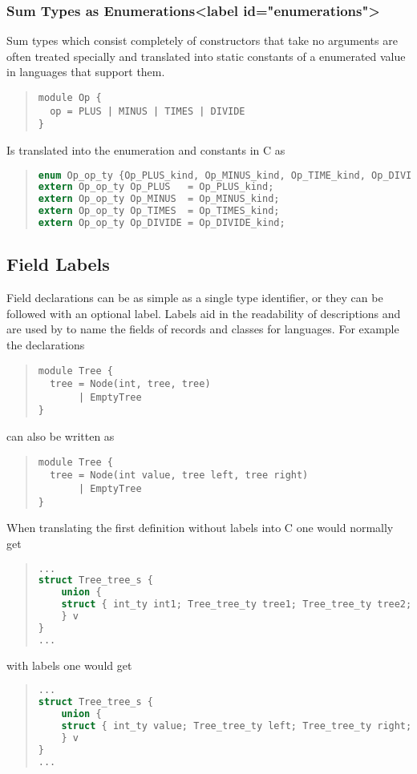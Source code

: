 \subsubsection{Sum Types as Enumerations<label id="enumerations">}
Sum types which consist completely of constructors that take no arguments
are often treated specially and translated into static constants of a
enumerated value in languages that support them.
\begin{quote}\begin{lstlisting}[language=ASDL]
module Op {
  op = PLUS | MINUS | TIMES | DIVIDE 
}
\end{lstlisting}\end{quote}%

Is translated into the enumeration and constants in C as
\begin{quote}\begin{lstlisting}[language=c]
enum Op_op_ty {Op_PLUS_kind, Op_MINUS_kind, Op_TIME_kind, Op_DIVIDE_kind};
extern Op_op_ty Op_PLUS   = Op_PLUS_kind;
extern Op_op_ty Op_MINUS  = Op_MINUS_kind;
extern Op_op_ty Op_TIMES  = Op_TIMES_kind;
extern Op_op_ty Op_DIVIDE = Op_DIVIDE_kind;
\end{lstlisting}\end{quote}%

\subsection{Field Labels}
Field declarations can be as simple as a single type identifier, or they can
be followed with an optional label. Labels aid in the readability of
descriptions and are used by \asdlgen{} to name the fields of records
and classes for languages. For example the declarations
\begin{quote}\begin{lstlisting}[language=ASDL]
module Tree {
  tree = Node(int, tree, tree)
       | EmptyTree
}
\end{lstlisting}\end{quote}%
can also be written as
\begin{quote}\begin{lstlisting}[language=ASDL]
module Tree {
  tree = Node(int value, tree left, tree right)
       | EmptyTree
}
\end{lstlisting}\end{quote}%

When translating the first definition without labels 
into C one would normally get
\begin{quote}\begin{lstlisting}[language=c]
...
struct Tree_tree_s {
    union {
    struct { int_ty int1; Tree_tree_ty tree1; Tree_tree_ty tree2; } ...
    } v
}
...
\end{lstlisting}\end{quote}%
with labels one would get
\begin{quote}\begin{lstlisting}[language=c]
...
struct Tree_tree_s {
    union {
    struct { int_ty value; Tree_tree_ty left; Tree_tree_ty right; } ...
    } v
}
...
\end{lstlisting}\end{quote}%

